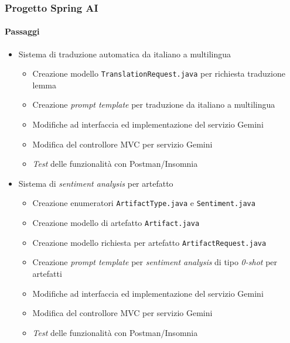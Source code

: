 \begin{frame}[t,fragile] \frametitle{Progetto Spring AI}
    \framesubtitle{Passaggi}
    {\small
        \begin{itemize}[leftmargin=10pt,align=right]
            \item[\alert{\faArrowCircleRight}] Sistema di \alert{traduzione automatica} da italiano a multilingua
            \begin{itemize}[leftmargin=10pt,align=right]
                \item[\alertedcircled{1}] Creazione modello \texttt{TranslationRequest.java} per richiesta traduzione lemma
                \item[\alertedcircled{2}] Creazione \textit{prompt template} per traduzione da italiano a multilingua 
                \item[\alertedcircled{3}] Modifiche ad interfaccia ed implementazione del servizio Gemini
                \item[\alertedcircled{4}] Modifica del controllore MVC per servizio Gemini
                \item[\alertedcircled{5}] \textit{Test} delle funzionalità con Postman/Insomnia           
            \end{itemize}
            \item[\alert{\faArrowCircleRight}] Sistema di \alert{\textit{sentiment analysis}} per artefatto
            \begin{itemize}[leftmargin=10pt,align=right]
                \item[\alertedcircled{1}] Creazione enumeratori \texttt{ArtifactType.java} e \texttt{Sentiment.java}
                \item[\alertedcircled{2}] Creazione modello di artefatto \texttt{Artifact.java}
                \item[\alertedcircled{3}] Creazione modello richiesta per artefatto \texttt{ArtifactRequest.java}
                \item[\alertedcircled{4}] Creazione \textit{prompt template} per \textit{sentiment analysis} di tipo \textit{0-shot} per artefatti
                \item[\alertedcircled{5}] Modifiche ad interfaccia ed implementazione del servizio Gemini
                \item[\alertedcircled{6}] Modifica del controllore MVC per servizio Gemini
                \item[\alertedcircled{7}] \textit{Test} delle funzionalità con Postman/Insomnia
            \end{itemize}
        \end{itemize}
    }
\end{frame}
%
